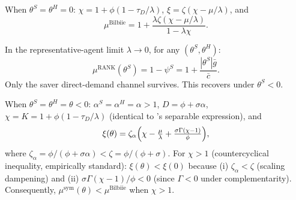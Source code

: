 \begin{corollary}\label{cor:bilbiie}
When $\theta^{S}=\theta^{H}=0$: $\chi=1+\phi(1-\tau_{D}/\lambda)$,
$\xi=\zeta(\chi-\mu/\lambda)$, and
\begin{equation}\label{eq:mult-bilbiie}
  \mu^{\mathrm{Bilbiie}}=1+\frac{\lambda\zeta(\chi-\mu/\lambda)}{1-\lambda\chi}.
\end{equation}
\end{corollary}

\begin{corollary}\label{cor:rank}
In the representative-agent limit $\lambda\to 0$, for any $(\theta^{S},\theta^{H})$:
\begin{equation}
  \mu^{\mathrm{RANK}}(\theta^{S})=1-\psi^{S}=1+\frac{|\theta^{S}|\bar g}{\bar c}.
\end{equation}
Only the saver direct-demand channel survives. This recovers
\citet{BouakezRebei2007} under $\theta^{S}<0$.
\end{corollary}

\begin{corollary}\label{cor:sym}
When $\theta^{S}=\theta^{H}=\theta<0$: $\alpha^{S}=\alpha^{H}=\alpha>1$,
$D=\phi+\sigma\alpha$, $\chi=K=1+\phi(1-\tau_{D}/\lambda)$ (identical to
\bilbiie{}'s separable expression), and
\begin{equation}\label{eq:xi-sym}
  \xi(\theta)=\zeta_{\alpha}\Bigl(\chi-\tfrac{\mu}{\lambda}+\tfrac{\sigma\Gamma(\chi-1)}{\phi}\Bigr),
\end{equation}
where $\zeta_{\alpha}=\phi/(\phi+\sigma\alpha)<\zeta=\phi/(\phi+\sigma)$.
For $\chi>1$ (countercyclical inequality, empirically standard):
$\xi(\theta)<\xi(0)$ because (i) $\zeta_{\alpha}<\zeta$ (scaling dampening)
and (ii) $\sigma\Gamma(\chi-1)/\phi<0$ (since $\Gamma<0$ under complementarity).
Consequently,
$\mu^{\mathrm{sym}}(\theta)<\mu^{\mathrm{Bilbiie}}$ when $\chi>1$.
\end{corollary}

